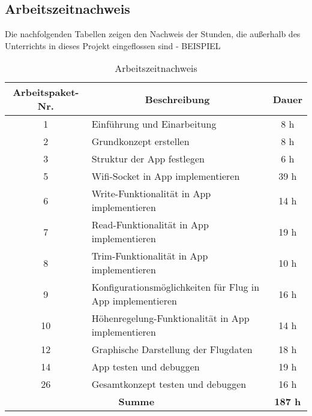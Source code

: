 
\subsection{Arbeitszeitnachweis}

\newpage
Die nachfolgenden Tabellen zeigen den Nachweis der Stunden, die außerhalb des Unterrichts in dieses Projekt eingeflossen sind - BEISPIEL
\begin{table}[h!]
\centering
\begin{tabular}{|c|l|c|}
\hline
\multicolumn{1}{|c|}{\textbf{Arbeitspaket-Nr.}} &
\multicolumn{1}{c|}{\textbf{Beschreibung}}  &
\multicolumn{1}{c|}{\textbf{Dauer}}  \\ \hline
  1 & Einführung und Einarbeitung & 8 h \\ \hline
  2 & Grundkonzept erstellen & 8 h \\ \hline
  3 & Struktur der App festlegen & 6 h \\ \hline
  5 & Wifi-Socket in App implementieren & 39 h \\ \hline
  6 & Write-Funktionalität in App implementieren & 14 h \\ \hline
  7 & Read-Funktionalität in App implementieren & 19 h \\ \hline
  8 & Trim-Funktionalität in App implementieren & 10 h \\ \hline
  9 & Konfigurationsmöglichkeiten für Flug in App implementieren & 16 h \\ \hline
  10 & Höhenregelung-Funktionalität in App implementieren & 14 h \\ \hline
  12 & Graphische Darstellung der Flugdaten & 18 h \\ \hline
  14 & App testen und debuggen & 19 h \\ \hline
  26 & Gesamtkonzept testen und debuggen & 16 h \\ \hline
  \multicolumn{2}{|c|}{\textbf{Summe}} & \textbf{187 h} \\ \hline
 \end{tabular}
\caption{Arbeitszeitnachweis}
\end{table}

\newpage




